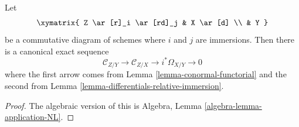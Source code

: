 \begin{lemma}
\label{lemma-two-immersions}
Let
$$
\xymatrix{
Z \ar[r]_i \ar[rd]_j & X \ar[d] \\
& Y
}
$$
be a commutative diagram of schemes where $i$ and $j$ are immersions.
Then there is a canonical exact sequence
$$
\mathcal{C}_{Z/Y} \to
\mathcal{C}_{Z/X} \to
i^*\Omega_{X/Y} \to 0
$$
where the first arrow comes from
Lemma \ref{lemma-conormal-functorial}
and the second from
Lemma \ref{lemma-differentials-relative-immersion}.
\end{lemma}

\begin{proof}
The algebraic version of this is
Algebra, Lemma \ref{algebra-lemma-application-NL}.
\end{proof}











